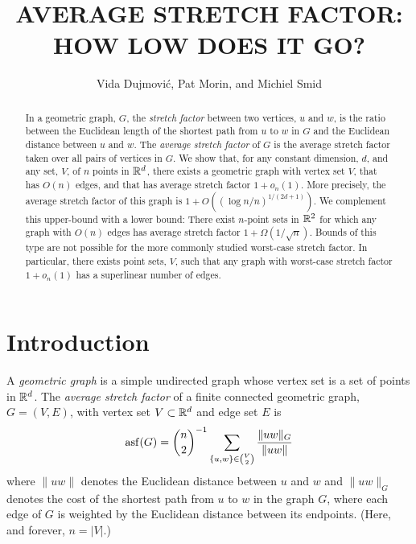 \documentclass{patmorin}
\title{\MakeUppercase{Average Stretch Factor: How Low Does It Go?}}
\author{Vida Dujmovi\'c, Pat Morin, and Michiel Smid}
\DeclareMathOperator{\asf}{asf}
\begin{document}
\begin{titlepage}
\maketitle

\begin{abstract}
  In a geometric graph, $G$, the \emph{stretch factor} between two
  vertices, $u$ and $w$, is the ratio between the Euclidean length of
  the shortest path from $u$ to $w$ in $G$ and the Euclidean distance
  between $u$ and $w$.  The \emph{average stretch factor} of $G$ is
  the average stretch factor taken over all pairs of vertices in $G$.
  We show that, for any constant dimension, $d$, and any set, $V$, of
  $n$ points in $\mathbb{R}^d$, there exists a geometric graph with vertex set
  $V$, that has $O(n)$ edges, and that has average stretch factor $1+
  o_n(1)$.  More precisely, the average stretch factor of this graph is
  $1+O((\log n/n)^{1/(2d+1)})$.  We complement this upper-bound with a
  lower bound: There exist $n$-point sets in $\mathbb{R}^2$ for which any graph
  with $O(n)$ edges has average stretch factor $1+\Omega(1/\sqrt{n})$.
  Bounds of this type are not possible for the more commonly studied
  worst-case stretch factor.  In particular, there exists point sets,
  $V$, such that any graph with worst-case stretch factor $1+o_n(1)$
  has a superlinear number of edges.
\end{abstract}

\end{titlepage}

\section{Introduction}

A \emph{geometric graph} is a simple undirected graph whose vertex set
is a set of points in $\mathbb{R}^d$.  The \emph{average stretch factor} of
a finite connected geometric graph, $G=(V,E)$, with vertex set $V\subset \mathbb{R}^d$
and edge set $E$ is
\begin{equation}
    \asf(G) = \binom{n}{2}^{-1}\sum_{\{u,w\}\in\binom{V}{2}}\frac{\|uw\|_G}{\|uw\|} \eqlabel{asf}
\end{equation}
where $\|uw\|$ denotes the Euclidean distance between $u$ and $w$
and $\|uw\|_G$ denotes the cost of the shortest path from $u$ to $w$
in the graph $G$, where each edge of $G$ is weighted by the Euclidean
distance between its endpoints.  (Here, and forever, $n=|V|$.)
\end{document}
